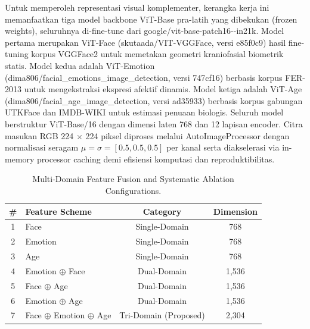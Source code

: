 Untuk memperoleh representasi visual komplementer, kerangka kerja ini memanfaatkan tiga model backbone ViT-Base pra-latih yang dibekukan (frozen weights), seluruhnya di-fine-tune dari google/\allowbreak vit-\allowbreak base-\allowbreak patch16--\allowbreak in21k. Model pertama merupakan ViT-Face (skutaada/\allowbreak VIT-\allowbreak VGGFace, versi e85f0c9) hasil fine-tuning korpus VGGFace2 untuk memetakan geometri kraniofasial biometrik statis. Model kedua adalah ViT-Emotion (dima806/\allowbreak facial\_\allowbreak emotions\_\allowbreak image\_\allowbreak detection, versi 747cf16) berbasis korpus FER-2013 untuk mengekstraksi ekspresi afektif dinamis. Model ketiga adalah ViT-Age (dima806/\allowbreak facial\_\allowbreak age\_\allowbreak image\_\allowbreak detection, versi ad35933) berbasis korpus gabungan UTKFace dan IMDB-WIKI untuk estimasi penuaan biologis. Seluruh model berstruktur ViT-Base/16 dengan dimensi laten 768 dan 12 lapisan encoder. Citra masukan RGB 224 $\times$ 224 piksel diproses melalui AutoImageProcessor dengan normalisasi seragam $\mu = \sigma = [0.5, 0.5, 0.5]$ per kanal serta diakselerasi via in-memory processor caching demi efisiensi komputasi dan reproduktibilitas.

\begin{table}[htbp]
\caption{Multi-Domain Feature Fusion and Systematic Ablation Configurations.}
\label{tab:2}
\label{tab:II}
\centering
\footnotesize
\setlength{\tabcolsep}{3.5pt}
\begin{tabular}{clcc}
\toprule
\# & Feature Scheme & Category & Dimension \\
\midrule
1 & Face & Single-Domain & 768 \\
2 & Emotion & Single-Domain & 768 \\
3 & Age & Single-Domain & 768 \\
4 & Emotion $\oplus$ Face & Dual-Domain & 1,536 \\
5 & Face $\oplus$ Age & Dual-Domain & 1,536 \\
6 & Emotion $\oplus$ Age & Dual-Domain & 1,536 \\
7 & Face $\oplus$ Emotion $\oplus$ Age & Tri-Domain (Proposed) & 2,304 \\
\bottomrule
\end{tabular}
\end{table}

